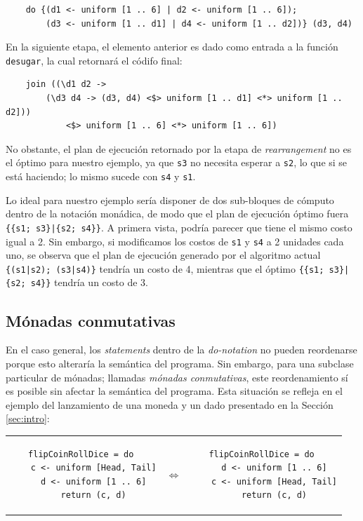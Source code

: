 \begin{verbatim}
    do {(d1 <- uniform [1 .. 6] | d2 <- uniform [1 .. 6]);
        (d3 <- uniform [1 .. d1] | d4 <- uniform [1 .. d2])} (d3, d4) 
\end{verbatim}

En la siguiente etapa, el elemento anterior es dado como entrada a la función \verb|desugar|, la cual retornará el códifo final:

\begin{verbatim}
    join ((\d1 d2 ->
        (\d3 d4 -> (d3, d4) <$> uniform [1 .. d1] <*> uniform [1 .. d2])) 
            <$> uniform [1 .. 6] <*> uniform [1 .. 6])
\end{verbatim}

No obstante, el plan de ejecución retornado por la etapa de \textit{rearrangement} no es el óptimo para nuestro ejemplo, ya que \verb|s3| no necesita esperar a \verb|s2|, lo que si se está haciendo; lo mismo sucede con \verb|s4| y \verb|s1|. 

Lo ideal para nuestro ejemplo sería disponer de dos sub-bloques de cómputo dentro de la notación monádica, de modo que el plan de ejecución óptimo fuera \verb!{{s1; s3}|{s2; s4}}!. A primera vista, podría parecer que tiene el mismo costo igual a 2. Sin embargo, si modificamos los costos de \verb|s1| y \verb|s4| a 2 unidades cada uno, se observa que el plan de ejecución generado por el algoritmo actual \verb!{(s1|s2); (s3|s4)}! tendría un costo de 4, mientras que el óptimo \verb!{{s1; s3}|{s2; s4}}! tendría un costo de 3.

\subsection{Mónadas conmutativas}\label{sec:sa}

En el caso general, los \textit{statements} dentro de la \textit{do-notation} no pueden reordenarse porque esto alteraría la semántica del programa. Sin embargo, para una subclase particular de mónadas; llamadas \textit{mónadas conmutativas}, este reordenamiento sí es posible sin afectar la semántica del programa. Esta situación se refleja en el ejemplo del lanzamiento de una moneda y un dado presentado en la Sección \ref{sec:intro}:

\begin{tabular}{ccc}
    \begin{minipage}{0.4\textwidth}
        \begin{verbatim}
flipCoinRollDice = do 
    c <- uniform [Head, Tail]
    d <- uniform [1 .. 6]
    return (c, d)
        \end{verbatim}
    \end{minipage}
    &
    \Large $\Leftrightarrow$
    &
    \begin{minipage}{0.3\textwidth}
        \begin{verbatim}
flipCoinRollDice = do 
    d <- uniform [1 .. 6]
    c <- uniform [Head, Tail]
    return (c, d)
        \end{verbatim}
    \end{minipage}
\end{tabular}

